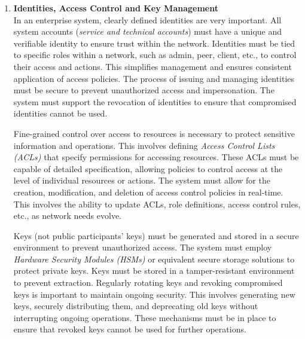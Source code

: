 \begin{enumerate}[label=\textbullet]
	\item\textbf{Identities, Access Control and Key Management}\cite{nist_pub_key_mgmt}\cite{sub_acc_add_key}\cite{nist_pub_bloc_acc_ctrl}\cite{hype_dkms}\\
	In an enterprise system, clearly defined identities are very important. All system accounts (\textit{service and technical accounts}) must have a unique and verifiable identity to ensure trust within the network. Identities must be tied to specific roles within a network, such as admin, peer, client, etc., to control their access and actions. This simplifies management and ensures consistent application of access policies. The process of issuing and managing identities must be secure to prevent unauthorized access and impersonation. The system must support the revocation of identities to ensure that compromised identities cannot be used. 
	
	Fine-grained control over access to resources is necessary to protect sensitive information and operations. This involves defining \textit{Access Control Lists (ACLs)} that specify permissions for accessing resources. These ACLs must be capable of detailed specification, allowing policies to control access at the level of individual resources or actions. The system must allow for the creation, modification, and deletion of access control policies in real-time. This involves the ability to update ACLs, role definitions, access control rules, etc., as network needs evolve.
	
	Keys (not public participants' keys) must be generated and stored in a secure environment to prevent unauthorized access. The system must employ \textit{Hardware Security Modules (HSMs)} or equivalent secure storage solutions to protect private keys. Keys must be stored in a tamper-resistant environment to prevent extraction. Regularly rotating keys and revoking compromised keys is important to maintain ongoing security. This involves generating new keys, securely distributing them, and deprecating old keys without interrupting ongoing operations. These mechanisms must be in place to ensure that revoked keys cannot be used for further operations.


\end{enumerate}
